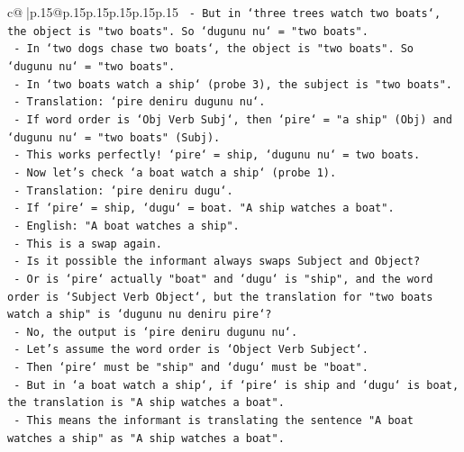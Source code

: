 \documentclass{article}
\begin{document}
{\begin{supertabular}{c@{$\;$}|p{.15\linewidth}@{}p{.15\linewidth}p{.15\linewidth}p{.15\linewidth}p{.15\linewidth}p{.15\linewidth}}
{{{\texttt{                           {-} But in `three trees watch two boats`, the object is "two boats". So `dugunu nu` = "two boats".} \\
\texttt{                           {-} In `two dogs chase two boats`, the object is "two boats". So `dugunu nu` = "two boats".} \\
\texttt{                           {-} In `two boats watch a ship` (probe 3), the subject is "two boats".} \\
\texttt{                           {-} Translation: `pire deniru dugunu nu`.} \\
\texttt{                           {-} If word order is `Obj Verb Subj`, then `pire` = "a ship" (Obj) and `dugunu nu` = "two boats" (Subj).} \\
\texttt{                           {-} This works perfectly! `pire` = ship, `dugunu nu` = two boats.} \\
\texttt{                           {-} Now let's check `a boat watch a ship` (probe 1).} \\
\texttt{                           {-} Translation: `pire deniru dugu`.} \\
\texttt{                           {-} If `pire` = ship, `dugu` = boat. "A ship watches a boat".} \\
\texttt{                           {-} English: "A boat watches a ship".} \\
\texttt{                           {-} This is a swap again.} \\
\texttt{                           {-} Is it possible the informant always swaps Subject and Object?} \\
\texttt{                           {-} Or is `pire` actually "boat" and `dugu` is "ship", and the word order is `Subject Verb Object`, but the translation for "two boats watch a ship" is `dugunu nu deniru pire`?} \\
\texttt{                           {-} No, the output is `pire deniru dugunu nu`.} \\
\texttt{                           {-} Let's assume the word order is `Object Verb Subject`.} \\
\texttt{                           {-} Then `pire` must be "ship" and `dugu` must be "boat".} \\
\texttt{                           {-} But in `a boat watch a ship`, if `pire` is ship and `dugu` is boat, the translation is "A ship watches a boat".} \\
\texttt{                           {-} This means the informant is translating the sentence "A boat watches a ship" as "A ship watches a boat".} \\
}}}
\end{supertabular}}
\end{document}
